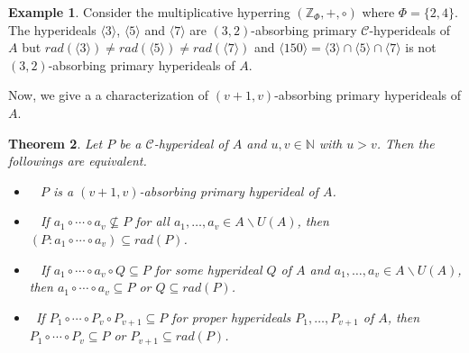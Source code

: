 \documentclass[preprint,review,10pt]{amsart}
\newtheorem{theorem}{Theorem}[section]
\theoremstyle{definition}
\newtheorem{example}[theorem]{Example}
\theoremstyle{remark}
\numberwithin{equation}{section}
\begin{document}
\begin{example} \label{ignor1}
Consider the multiplicative hyperring $(\mathbb{Z}_{\Phi},+,\circ)$ where $\Phi=\{2,4\}$. The hyperideals $\langle 3 \rangle$, $\langle 5 \rangle$ and $\langle 7 \rangle$ are $(3,2)$-absorbing primary $\mathcal{C}$-hyperideals of $A$ but  $rad(\langle 3 \rangle) \neq rad(\langle 5 \rangle) \neq rad(\langle 7 \rangle)$ and $\langle 150  \rangle=\langle 3 \rangle \cap \langle 5 \rangle \cap \langle 7 \rangle$ is not $(3,2)$-absorbing primary hyperideals of $A$.
\end{example}
Now, we give a a characterization of $(v+1,v)$-absorbing primary hyperideals of $A$. 
\begin{theorem}
Let $P$ be a $\mathcal{C}$-hyperideal of $A$ and $u,v \in \mathbb{N}$ with $u >v$. Then the followings are equivalent.
\begin{itemize}
\item[\rm{(i)}]~ $P$ is a $(v+1,v)$-absorbing primary hyperideal of $A$. 
\item[\rm{(ii)}]~ If $a_1 \circ \cdots \circ a_v \nsubseteq P$ for all $a_1, \ldots,a_v \in A \backslash U(A)$, then $(P : a_1 \circ \cdots \circ a_v) \subseteq rad(P)$.
\item[\rm{(iii)}]~ If $a_1 \circ \cdots \circ a_v \circ Q \subseteq P$ for some hyperideal $Q$ of $A$ and  $a_1, \ldots,a_v \in A \backslash U(A)$, then $a_1 \circ \cdots \circ a_v \subseteq P$ or $Q \subseteq rad(P)$.
\item[\rm{(iv)}]~If $P_1 \circ \cdots \circ P_v \circ P_{v+1} \subseteq P$ for proper hyperideals  $P_1, \ldots,P_{v+1}$ of $A$, then $P_1 \circ \cdots \circ P_v \subseteq P$ or $P_{v+1} \subseteq rad(P)$.
\end{itemize}
\end{theorem}
\end{document}
